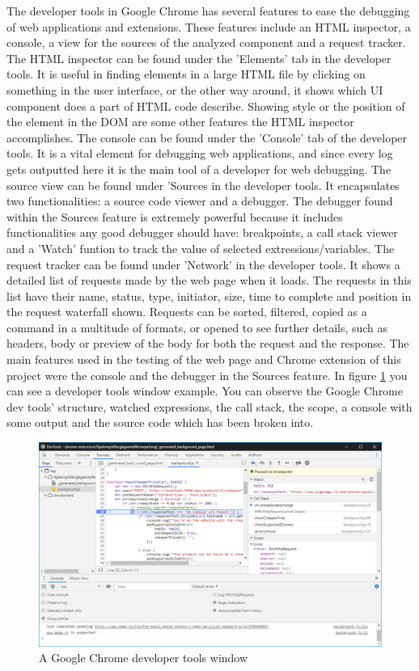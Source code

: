 \documentclass[12pt,a4paper,twoside]{report}
\begin{document}
The developer tools in Google Chrome has several features to ease the debugging of web applications and extensions. These features include an HTML inspector, a console, a view for the sources of the analyzed component and a request tracker. The HTML inspector can be found under the 'Elements' tab in the developer tools. It is useful in finding elements in a large HTML file by clicking on something in the user interface, or the other way around, it shows which UI component does a part of HTML code describe. Showing style or the position of the element in the DOM are some other features the HTML inspector accomplishes. The console can be found under the 'Console' tab of the developer tools. It is a vital element for debugging web applications, and since every log gets outputted here it is the main tool of a developer for web debugging. The source view can be found under 'Sources in the developer tools. It encapsulates two functionalities: a source code viewer and a debugger. The debugger found within the Sources feature is extremely powerful because it includes functionalities any good debugger should have: breakpoints, a call stack viewer and a 'Watch' funtion to track the value of selected extressions/variables. The request tracker can be found under 'Network' in the developer tools. It shows a detailed list of requests made by the web page when it loads. The requests in this list have their name, status, type, initiator, size, time to complete and position in the request waterfall shown. Requests can be sorted, filtered, copied as a command in a multitude of formats, or opened to see further details, such as headers, body or preview of the body for both the request and the response. The main features used in the testing of the web page and Chrome extension of this project were the console and the debugger in the Sources feature. In figure \ref{fig:dev_tools_break} you can see a developer tools window example. You can observe the Google Chrome dev tools' structure, watched expressions, the call stack, the scope, a console with some output and the source code which has been broken into.

\begin{figure}[ht]
  \centering
  \includegraphics[width=0.97\linewidth]{img/dev_tools_break.png}
  \caption[]{A Google Chrome developer tools window}
  \label{fig:dev_tools_break}
\end{figure}
\end{document}
